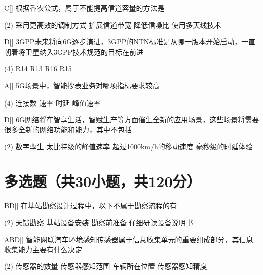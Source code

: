 \begin{choice}{C}[]
    根据香农公式，属于不能提高信道容量的方法是
    \begin{tasks}(2)
        \task 采用更高效的调制方式
        \task 扩展信道带宽
        \task 降低信噪比
        \task 使用多天线技术
    \end{tasks}
\end{choice}


\begin{choice}{D}[]
    3GPP未来将向6G逐步演进，3GPP的NTN标准是从哪一版本开始启动，一直朝着将卫星纳入3GPP技术规范的目标在前进
    \begin{tasks}(4)
        \task R14
        \task R13
        \task R16
        \task R15
    \end{tasks}
\end{choice}


\begin{choice}{A}[]
    5G场景中，智能抄表业务对哪项指标要求较高
    \begin{tasks}(4)
        \task 连接数
        \task 速率
        \task 时延
        \task 峰值速率
    \end{tasks}
\end{choice}


\begin{choice}{D}[]
    6G网络将在智享生活，智赋生产等方面催生全新的应用场景，这些场景将需要很多全新的网络功能和能力，其中不包括
    \begin{tasks}(2)
        \task 数字孪生
        \task 太比特级的峰值速率
        \task 超过1000km/h的移动速度
        \task 毫秒级的时延体验
    \end{tasks}
\end{choice}



\section{多选题（共30小题，共120分）}

\begin{choice}{\;BD\;}[]
    在基站勘察设计过程中，以下不属于勘察流程的有
    \begin{tasks}(2)
        \task 天馈勘察
        \task 基站设备安装
        \task 勘察前准备
        \task 仔细研读设备说明书
    \end{tasks}
\end{choice}

\begin{choice}{\;ABD\;}[]
    智能网联汽车环境感知传感器属于信息收集单元的重要组成部分，其信息收集能力主要有什么决定
    \begin{tasks}(2)
        \task 传感器的数量
        \task 传感器感知范围
        \task 车辆所在位置
        \task 传感器感知精度
    \end{tasks}
\end{choice}

